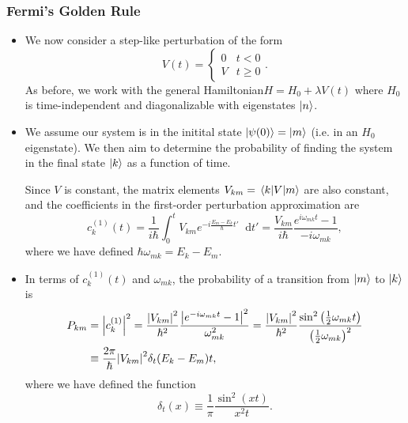 \documentclass[11pt, a4paper]{article}
\newcommand{\diff}{\mathop{}\!\mathrm{d}} %
\newcommand{\Ham}{Hamiltonian\xspace}
\begin{document}
\subsubsection{Fermi's Golden Rule}
\begin{itemize}
    \item We now consider a step-like perturbation of the form
    \begin{equation*}
        V(t) = 
        \begin{cases}
            0 & t < 0\\
            V & t \geq 0
        \end{cases}.
    \end{equation*}
    As before, we work with the general \Ham $ H = H_{0} + \lambda V(t) $ where $ H_{0} $ is time-independent and diagonalizable with eigenstates $ \ket{n} $.

    \item We assume our system is in the initital state $ \ket{\psi(0)} = \ket{m} $ (i.e. in an $ H_{0} $ eigenstate). We then aim to determine the probability of finding the system in the final state $ \ket{k} $ as a function of time.

    Since $ V $ is constant, the matrix elements $ V_{km} = \mel{k}{V}{m} $ are also constant, and the coefficients in the first-order perturbation approximation are
    \begin{equation*}
        c_{k}^{(1)}(t) = \frac{1}{i \hbar} \int_{0}^{t} V_{km}e^{-i \frac{E_{m} - E_{k}}{\hbar}t'} \diff t' = \frac{V_{km}}{i \hbar} \frac{e^{i\omega_{mk}t} - 1}{- i \omega_{mk}},
    \end{equation*}
    where we have defined $ \hbar \omega_{mk} = E_{k} - E_{m} $. 

    \item In terms of $ c_{k}^{(1)}(t) $ and $ \omega_{mk} $, the probability of a transition from $ \ket{m} $ to $ \ket{k} $ is
    \begin{align*}
        P_{km} &= \abs{c_{k}^{(1)}}^{2} = \frac{\abs{V_{km}}^{2}}{\hbar^{2}} \frac{\abs{e^{-i\omega_{mk}t} - 1}^{2}}{\omega^{2}_{mk}} = \frac{\abs{V_{km}}^{2}}{\hbar^{2}} \frac{\sin^{2}\left( \tfrac{1}{2} \omega_{mk}t \right)}{\left( \tfrac{1}{2}\omega_{mk} \right)^{2}}\\
        & \equiv \frac{2\pi}{\hbar}\abs{V_{km}}^{2} \delta_{t}(E_{k} - E_{m})t,
    \end{align*}
    where we have defined the function
    \begin{equation*}
        \delta_{t}(x) \equiv \frac{1}{\pi} \frac{\sin^{2}(xt)}{x^{2}t}.
    \end{equation*}
    

\end{itemize}
\end{document}
